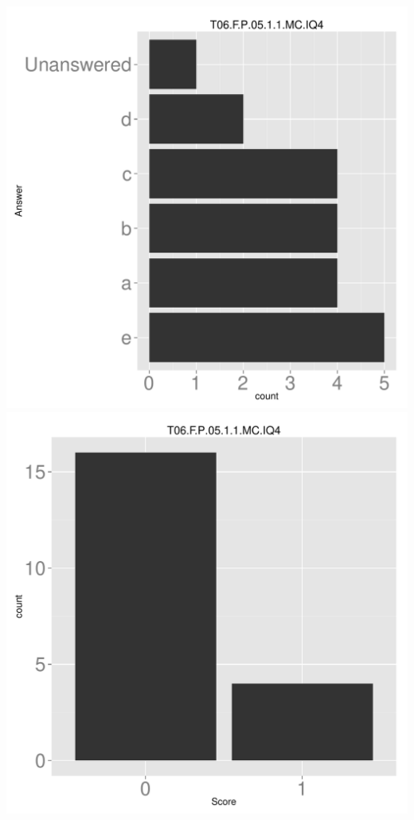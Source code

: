 \documentclass[12pt,nohyper]{tufte-handout}\usepackage[]{graphicx}\usepackage[]{color}
\begin{document}
\begin{center} \includegraphics[width=.45\linewidth]{Topic06_62_answer} \includegraphics[width=.45\linewidth]{Topic06_62_score} \end{center} 
\end{document}
